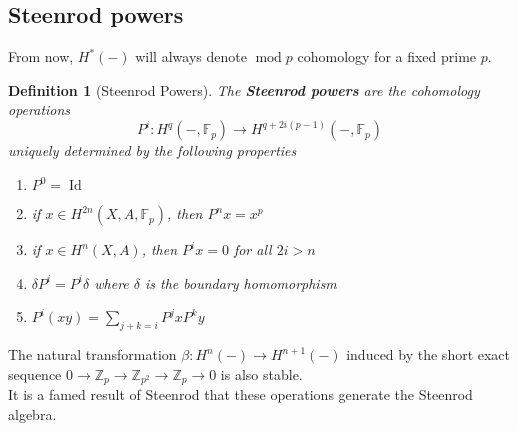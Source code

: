 \documentclass[11pt, a4paper]{article}
\DeclareMathOperator*{\id}{Id}
\DeclareMathOperator*{\cmod}{mod}
\newtheorem{defn}{Definition}
\theoremstyle{plain}
\begin{document}
\subsection{Steenrod powers}
From now, $H^{\ast}( -) $ will always denote $\cmod p$ cohomology for a fixed prime $p$.
\begin{defn}[Steenrod Powers]
	The \textbf{Steenrod powers} are the cohomology operations 
	\[ 
		P^{i}\colon H^{q}( -, \mathbb{F}_p) \to H^{q+ 2i ( p-1) }( -, \mathbb{F}_p) 
	\]
	uniquely determined by the following properties
	\begin{enumerate}
	\item $P^{0}= \id$ 
	\item if $x \in H^{2n}( X,A, \mathbb{F}_p) $, then $P^{n}x = x^{p}$ 
	\item if $x \in H^{n}( X,A) $, then $P^{i}x =0$ for all $2i >n$ 
	\item $\delta P^{i} = P^{i}\delta$ where $\delta$ is the boundary homomorphism
	\item $P^{i}( xy) = \sum_{j+k=i} P^{j}x P^{k}y$
	\end{enumerate}
\end{defn}
The natural transformation $\beta\colon H^{n}( -) \to H^{n+1}( -) $ induced by the short exact sequence $0 \to \mathbb{Z}_p \to \mathbb{Z}_{p^{2}} \to \mathbb{Z}_p \to 0$ is also stable.\\
It is a famed result of Steenrod that these operations generate the Steenrod algebra.
\end{document}
